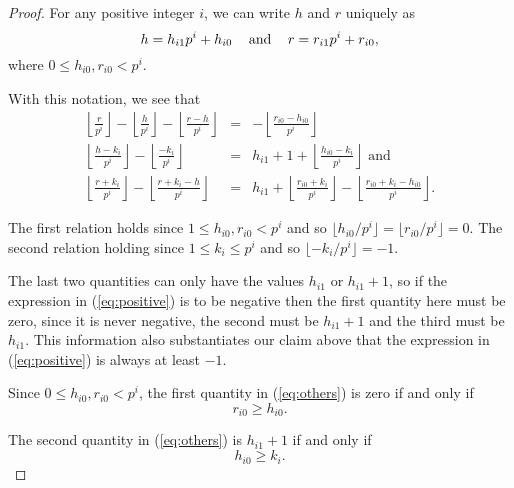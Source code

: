 \documentclass{jT}
\theoremstyle{definition}
\begin{document}
\begin{proof}
For any positive integer $i$, we can write $h$ and $r$ uniquely as
\begin{displaymath}
h = h_{i1}p^{i}+h_{i0} \hspace{3.0mm} \mbox{ and } \hspace{3.0mm}
r = r_{i1}p^{i}+r_{i0}, 
\end{displaymath}
where $0 \leq h_{i0},r_{i0} < p^{i}$.  

With this notation, we see that 
\begin{eqnarray}
\label{eq:others}
\left\lfloor \frac{r}{p^{i}} \right\rfloor - \left\lfloor \frac{h}{p^{i}} \right\rfloor 
- \left\lfloor \frac{r-h}{p^{i}} \right\rfloor
& = & - \left\lfloor \frac{r_{i0}-h_{i0}}{p^{i}} \right\rfloor 
      \nonumber \\
\left\lfloor \frac{h-k_{i}}{p^{i}} \right\rfloor - \left\lfloor \frac{-k_{i}}{p^{i}} \right\rfloor
& = & h_{i1} + 1 + \left\lfloor \frac{h_{i0}-k_{i}}{p^{i}} \right\rfloor
      \mbox{ and } \\
\left\lfloor \frac{r+k_{i}}{p^{i}} \right\rfloor - \left\lfloor \frac{r+k_{i}-h}{p^{i}} \right\rfloor
& = & h_{i1} + \left\lfloor \frac{r_{i0}+k_{i}}{p^{i}} \right\rfloor
	    - \left\lfloor \frac{r_{i0}+k_{i}-h_{i0}}{p^{i}} \right\rfloor.
      \nonumber
\end{eqnarray}

The first relation holds since $1 \leq h_{i0}, r_{i0} < p^{i}$ and so
$\lfloor h_{i0}/p^{i} \rfloor = \lfloor r_{i0}/p^{i} \rfloor =0$. The second
relation holding since $1 \leq k_{i} \leq p^{i}$ and so $\lfloor -k_{i}/p^{i} \rfloor =-1$. 

The last two quantities can only have the values $h_{i1}$ or $h_{i1}+1$,
so if the expression in (\ref{eq:positive}) is to be negative then the first
quantity here must be zero, since it is never negative, the second must
be $h_{i1}+1$ and the third must be $h_{i1}$. This information also
substantiates our claim above that the expression in (\ref{eq:positive})
is always at least $-1$. 

Since $0 \leq h_{i0}, r_{i0} < p^{i}$, the first quantity in
(\ref{eq:others}) is zero if and only if 
\begin{equation}
\label{eq:rh}
r_{i0} \geq h_{i0}. 
\end{equation}

The second quantity in (\ref{eq:others}) is $h_{i1}+1$ if and only if
\begin{equation}
\label{eq:hk}
h_{i0} \geq k_{i}. 
\end{equation}


\end{proof}
\end{document}
